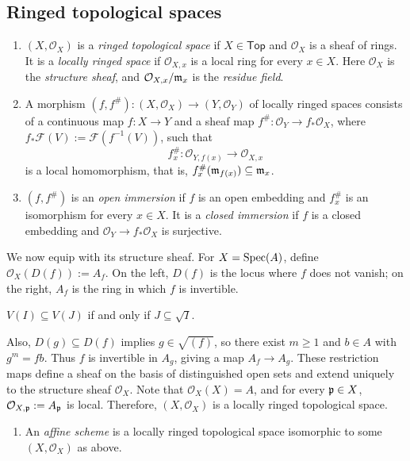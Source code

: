 \documentclass[11pt,a4paper]{article}
\begin{document}
\subsection{Ringed topological spaces}
\setcounter{definition}{21}\begin{definition}
\begin{enumerate}[label=(\roman*)]
\setcounter{enumi}{0}\item $(X,\mathcal O_X)$ is a \emph{ringed topological space} if $X\in\mathsf{Top}$ and $\mathcal O_X$ is a sheaf of rings. It is a \emph{locally ringed space} if $\mathcal O_{X,x}$ is a local ring for every $x\in X$. Here $\mathcal O_X$ is the \emph{structure sheaf}, and $\mathcal O_{X,x}/\mathfrak m_x$ is the \emph{residue field}.
\setcounter{enumi}{1}\item A morphism $(f,f^{\#}):(X,\mathcal O_X)\to(Y,\mathcal O_Y)$ of locally ringed spaces consists of a continuous map $f:X\to Y$ and a sheaf map $f^{\#}:\mathcal O_Y\to f_*\mathcal O_X$, where $f_*\mathcal F(V):=\mathcal F(f^{-1}(V))$, such that
\[
f_x^{\#}:\mathcal O_{Y,f(x)}\longrightarrow \mathcal O_{X,x}
\]
is a local homomorphism, that is, $f_x^{\#}(\mathfrak m_{f(x)})\subseteq\mathfrak m_x$.
\setcounter{enumi}{2}\item $(f,f^{\#})$ is an \emph{open immersion} if $f$ is an open embedding and $f_x^{\#}$ is an isomorphism for every $x\in X$. It is a \emph{closed immersion} if $f$ is a closed embedding and $\mathcal O_Y\to f_*\mathcal O_X$ is surjective.
\end{enumerate}
\end{definition}
We now equip  with its structure sheaf. For $X=\operatorname{Spec}(A)$, define $\mathcal O_X(D(f)):=A_f$. On the left, $D(f)$ is the locus where $f$ does not vanish; on the right, $A_f$ is the ring in which $f$ is invertible.
\setcounter{theorem}{32}\begin{lemma}
$V(I)\subseteq V(J)$ if and only if $J\subseteq\sqrt I$.
\end{lemma}
Also, $D(g)\subseteq D(f)$ implies $g\in\sqrt{(f)}$, so there exist $m\ge1$ and $b\in A$ with $g^m=fb$.
Thus $f$ is invertible in $A_g$, giving a map $A_f\to A_g$. These restriction maps define a sheaf on the basis of distinguished open sets and extend uniquely to the structure sheaf $\mathcal O_X$. Note that $\mathcal O_X(X)=A$, and for every $\mathfrak p\in X$, $\mathcal O_{X,\mathfrak p}:=A_{\mathfrak p}$ is local. Therefore, $(X,\mathcal O_X)$ is a locally ringed topological space.
\setcounter{definition}{22}\begin{definition}
\begin{enumerate}[label=(\roman*)]
\setcounter{enumi}{0}\item An \emph{affine scheme} is a locally ringed topological space isomorphic to some $(X,\mathcal O_X)$ as above.
\end{enumerate}
\end{definition}
\end{document}
